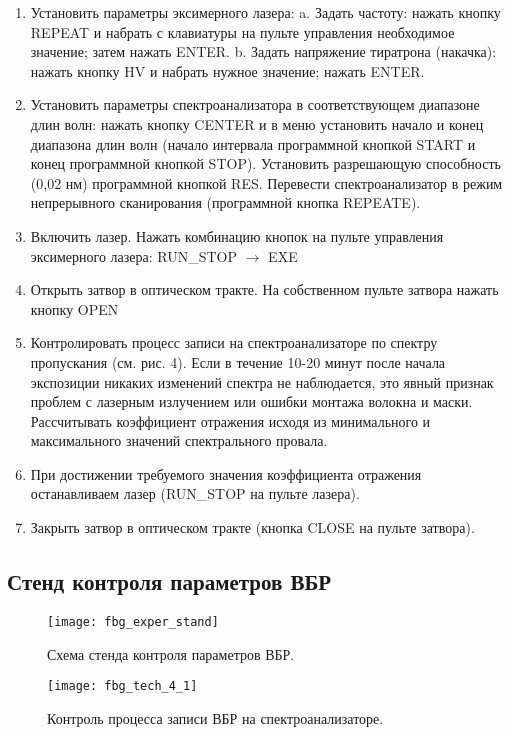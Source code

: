 \begin{enumerate}
    \item Установить параметры эксимерного лазера:
    a.  Задать частоту: нажать кнопку REPEAT и набрать с клавиатуры на пульте управления необходимое значение; затем нажать ENTER.
    b.  Задать напряжение тиратрона (накачка): нажать кнопку HV и набрать нужное значение; нажать ENTER.
    \item Установить параметры спектроанализатора в соответствующем диапазоне длин волн: нажать кнопку CENTER и в меню установить начало и конец диапазона длин волн (начало интервала программной кнопкой START и конец программной кнопкой STOP). Установить разрешающую способность (0,02 нм) программной кнопкой RES. Перевести спектроанализатор в режим непрерывного сканирования (программной кнопка REPEATE).
    \item Включить лазер. Нажать комбинацию кнопок на пульте управления эксимерного лазера: RUN\_STOP $\rightarrow$ EXE
    \item Открыть затвор в оптическом тракте. На собственном пульте затвора нажать кнопку OPEN
    \item Контролировать процесс записи на спектроанализаторе по спектру пропускания (см. рис. 4). Если в течение 10-20 минут после начала экспозиции никаких изменений спектра не наблюдается, это явный признак проблем с лазерным излучением или ошибки монтажа волокна и маски. Рассчитывать коэффициент отражения исходя из минимального и максимального значений спектрального провала.
    \item При достижении требуемого значения коэффициента отражения останавливаем лазер (RUN\_STOP на пульте лазера).
    \item Закрыть затвор в оптическом тракте (кнопка CLOSE на пульте затвора).
\end{enumerate}


\subsection{Стенд контроля параметров ВБР}
\label{sub:fbg_exper_paramcontrol}

\begin{figure}
  \centering
  \texttt{[image: fbg\_exper\_stand]}
  \caption{Схема стенда контроля параметров ВБР.}
  \label{img:fbg_tech_4}
\end{figure}

\begin{figure}
  \centering
  \texttt{[image: fbg\_tech\_4\_1]}
  \caption{Контроль процесса записи ВБР на спектроанализаторе.}
  \label{img:fbg_tech_4}
\end{figure}

